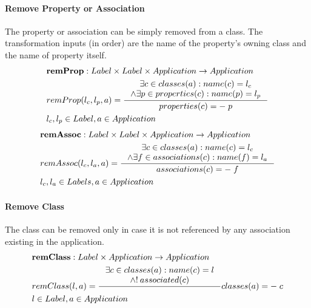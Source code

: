\documentclass[11pt]{article}
\begin{document}
\paragraph{Remove Property or Association} The property or association can be simply removed from a class. The transformation inputs (in order) are the name of the property's owning class and the name of property itself.
\begin{align*}
&	\mathbf{remProp} : Label \times Label \times Application \rightarrow Application \\
& 	remProp(l_c, l_p, a) = \inference{\exists c \in classes(a) : name(c) = l_c \\ \wedge \exists p \in properties(c) : name(p) = l_p
	}{properties(c) =- \; p }\\
&	l_c, l_p \in Label, a \in Application 
\end{align*}
\begin{align*}
&	\mathbf{remAssoc} : Label \times Label \times Application \rightarrow Application \\
&	remAssoc(l_c, l_a, a) = \inference{\exists c \in classes(a) : name(c) = l_c \\ \wedge \exists f \in associations(c) : name(f) = l_a }{associations(c) =- \; f} \\
&	l_c, l_a \in Labels, a \in Application
\end{align*}

\paragraph{Remove Class} The class can be removed only in case it is not referenced by any association existing in the application.
\begin{align*}
&	\mathbf{remClass} : Label \times Application \rightarrow Application \\
&	remClass(l, a) = \inference{\exists c \in classes(a) : name(c) = l \\ \wedge !\: associated(c)
	} {classes(a) =- \; c }\\
&	l \in Label,a \in Application
\end{align*}
\end{document}

